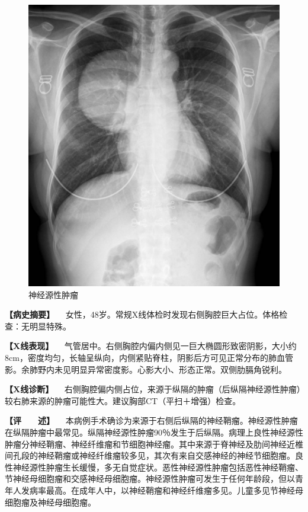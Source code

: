 \begin{figure}[!htbp]
 \centering
 \includegraphics{./images/Image00200.jpg}
 \captionsetup{justification=centering}
 \caption{神经源性肿瘤}
 \label{fig3-12-7}
  \end{figure} 

\textbf{【病史摘要】}
　女性，48岁。常规X线体检时发现右侧胸腔巨大占位。体格检查：无明显特殊。

\textbf{【X线表现】}
　气管居中。右侧胸腔内偏内侧见一巨大椭圆形致密阴影，大小约8cm，密度均匀，长轴呈纵向，内侧紧贴脊柱，阴影后方可见正常分布的肺血管影。余肺野内未见明显异常密度影。心影大小、形态正常。双侧肋膈角锐利。

\textbf{【X线诊断】}
　右侧胸腔偏内侧占位，来源于纵隔的肿瘤（后纵隔神经源性肿瘤）较右肺来源的肿瘤可能性大。建议胸部CT（平扫＋增强）检查。

\textbf{【评　　述】}
　本病例手术确诊为来源于右侧后纵隔的神经鞘瘤。神经源性肿瘤在纵隔肿瘤中最常见。纵隔神经源性肿瘤90％发生于后纵隔。病理上良性神经源性肿瘤分神经鞘瘤、神经纤维瘤和节细胞神经瘤。其中来源于脊神经及肋间神经近椎间孔段的神经鞘瘤或神经纤维瘤较多见，其次有来自交感神经的神经节细胞瘤。良性神经源性肿瘤生长缓慢，多无自觉症状。恶性神经源性肿瘤包括恶性神经鞘瘤、节神经母细胞瘤和交感神经母细胞瘤。神经源性肿瘤可发生于任何年龄段，但以青年人发病率最高。在成年人中，以神经鞘瘤和神经纤维瘤多见。儿童多见节神经母细胞瘤及神经母细胞瘤。

